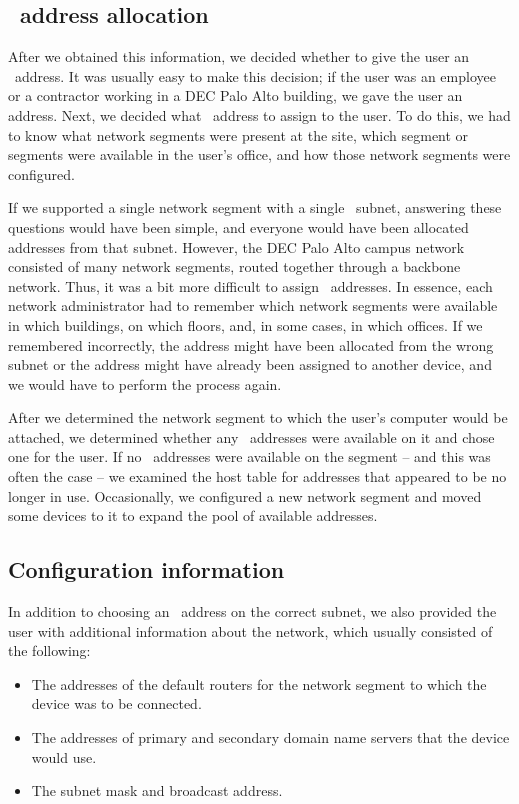 \subsection{\IP\ address allocation}
After we obtained this information, we decided whether to give the user an \IP\ address.
It was usually easy to make this decision; if the user was an employee or a contractor working in a \acs{DEC} Palo Alto building, we gave the user an address.
Next, we decided what \IP\ address to assign to the user.
To do this, we had to know what network segments were present at the site, which segment or segments were available in the user's office, and how those network segments were configured.

If we supported a single network segment with a single \IP\ subnet, answering these questions would have been simple, and everyone would have been allocated addresses from that subnet.
However, the \acs{DEC} Palo Alto campus network consisted of many network segments, routed together through a backbone network.
Thus, it was a bit more difficult to assign \IP\ addresses.
In essence, each network administrator had to remember which network segments were available in which buildings, on which floors, and, in some cases, in which offices.
If we remembered incorrectly, the address might have been allocated from the wrong subnet or the address might have already been assigned to another device, and we would have to perform the process again.

After we determined the network segment to which the user's computer would be attached, we determined whether any \IP\ addresses were available on it and chose one for the user.
If no \IP\ addresses were available on the segment -- and this was often the case -- we examined the host table for addresses that appeared to be no longer in use.
Occasionally, we configured a new network segment and moved some devices to it to expand the pool of available addresses.

\subsection{Configuration information}
In addition to choosing an \IP\ address on the correct subnet, we also provided the user with additional information about the network, which usually consisted of the following:
\begin{itemize}
\item
   The addresses of the default routers for the network segment to which the device was to be connected.
\item
   The addresses of primary and secondary domain name servers that the device would use.
\item
   The subnet mask and broadcast address.
\end{itemize}

